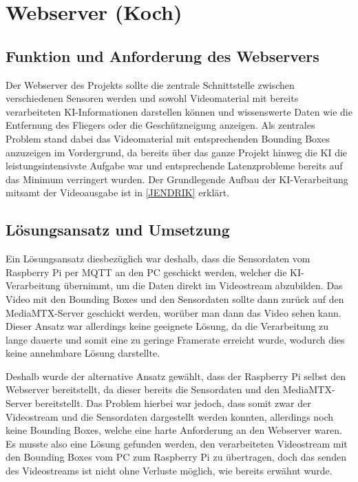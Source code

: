 \chapter{Webserver (Koch)}
\label{sec:Webserver}
\section{Funktion und Anforderung des Webservers}
Der Webserver des Projekts sollte die zentrale Schnittstelle zwischen verschiedenen Sensoren werden und sowohl Videomaterial mit bereits verarbeiteten KI-Informationen darstellen können und wissenswerte Daten wie die Entfernung des Fliegers oder die Geschützneigung anzeigen.
Als zentrales Problem stand dabei das Videomaterial mit entsprechenden Bounding Boxes anzuzeigen im Vordergrund, da bereits über das ganze Projekt hinweg die KI die leistungsintensivste Aufgabe war und entsprechende Latenzprobleme bereits auf das Minimum verringert wurden.
Der Grundlegende Aufbau der KI-Verarbeitung mitsamt der Videoausgabe ist in \ref{JENDRIK} erklärt.

\section{Lösungsansatz und Umsetzung}
Ein Lösungsansatz diesbezüglich war deshalb, dass die Sensordaten vom Raspberry Pi per MQTT an den PC geschickt werden, welcher die KI-Verarbeitung übernimmt, um die Daten direkt im Videostream abzubilden.
Das Video mit den Bounding Boxes und den Sensordaten sollte dann zurück auf den MediaMTX-Server geschickt werden, worüber man dann das Video sehen kann.
Dieser Ansatz war allerdings keine geeignete Lösung, da die Verarbeitung zu lange dauerte und somit eine zu geringe Framerate erreicht wurde, wodurch dies keine annehmbare Lösung darstellte.


Deshalb wurde der alternative Ansatz gewählt, dass der Raspberry Pi selbst den Webserver bereitstellt, da dieser bereits die Sensordaten und den MediaMTX-Server bereitstellt.
Das Problem hierbei war jedoch, dass somit zwar der Videostream und die Sensordaten dargestellt werden konnten, allerdings noch keine Bounding Boxes, welche eine harte Anforderung an den Webserver waren.
Es musste also eine Lösung gefunden werden, den verarbeiteten Videostream mit den Bounding Boxes vom PC zum Raspberry Pi zu übertragen, doch das senden des Videostreams ist nicht ohne Verluste möglich, wie bereits erwähnt wurde.

